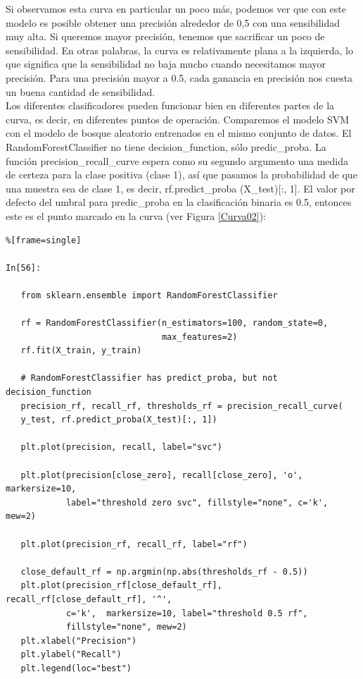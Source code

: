 {Si observamos   esta curva en particular un poco más, podemos ver que con este modelo es posible
 obtener una precisión   alrededor de 0,5 con una sensibilidad muy alta. Si queremos  mayor precisión, tenemos que sacrificar un poco de sensibilidad. En otras palabras,  la curva es relativamente
plana a la izquierda, lo que significa que la sensibilidad no baja mucho cuando necesitamos
mayor precisión. Para una precisión mayor a 0.5, cada ganancia en precisión nos cuesta un buena cantidad de  sensibilidad. \\
 
Los diferentes clasificadores pueden funcionar bien en diferentes partes de la curva, es decir, en diferentes puntos de operación.    Comparemos el modelo SVM  con el modelo de bosque aleatorio entrenados  en el mismo conjunto de datos.   El  {\ttfamily RandomForestClassifier} no tiene  {\ttfamily decision\_function}, sólo {\ttfamily  predic\_proba}.     La función {\ttfamily precision\_recall\_curve} espera como su segundo argumento   una medida de certeza para la clase positiva (clase 1), así que pasamos la probabilidad de que una muestra sea de clase 1, es decir, {\ttfamily rf.predict\_proba (X\_test)[:, 1]}.   El valor por defecto del umbral para {\ttfamily predic\_proba}  en la clasificación binaria es 0.5, entonces este es el punto marcado en la curva (ver Figura \ref{Curva02}):



\begin{lstlisting}%[frame=single]

In[56]:

   from sklearn.ensemble import RandomForestClassifier
   
   rf = RandomForestClassifier(n_estimators=100, random_state=0, 
                               max_features=2)
   rf.fit(X_train, y_train)
   
   # RandomForestClassifier has predict_proba, but not decision_function
   precision_rf, recall_rf, thresholds_rf = precision_recall_curve(
   y_test, rf.predict_proba(X_test)[:, 1])
   
   plt.plot(precision, recall, label="svc")
   
   plt.plot(precision[close_zero], recall[close_zero], 'o', markersize=10,
            label="threshold zero svc", fillstyle="none", c='k', mew=2)
   
   plt.plot(precision_rf, recall_rf, label="rf")
   
   close_default_rf = np.argmin(np.abs(thresholds_rf - 0.5))
   plt.plot(precision_rf[close_default_rf], recall_rf[close_default_rf], '^',
            c='k',  markersize=10, label="threshold 0.5 rf", 
            fillstyle="none", mew=2)            
   plt.xlabel("Precision")
   plt.ylabel("Recall")
   plt.legend(loc="best")


\end{lstlisting}}
